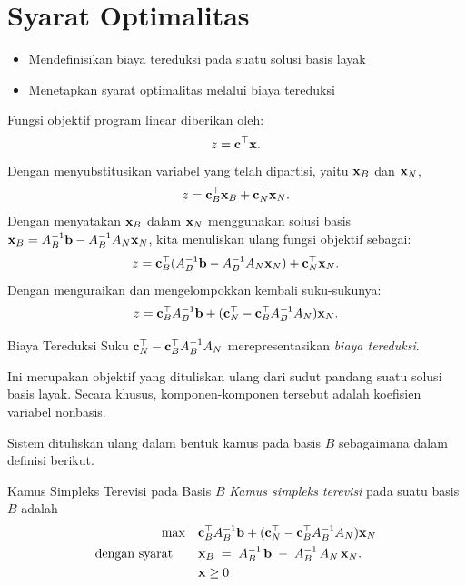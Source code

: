 \section{Syarat Optimalitas}
\label{sec:optimality-conditions}
\begin{outcome}
\begin{itemize}
\item Mendefinisikan biaya tereduksi pada suatu solusi basis layak
\item Menetapkan syarat optimalitas melalui biaya tereduksi
\end{itemize}
\end{outcome}
Fungsi objektif program linear diberikan oleh:
    \[
    z = \mathbf{c}^\top \mathbf{x}.
    \]
    Dengan menyubstitusikan variabel yang telah dipartisi, yaitu \( \mathbf{x}_B \) dan \( \mathbf{x}_N \),
    \[
    z =\mathbf{c}_B^\top \mathbf{x}_B +\mathbf{c}_N^\top \mathbf{x}_N.
    \]
    Dengan menyatakan \( \mathbf{x}_B \) dalam \( \mathbf{x}_N \) menggunakan solusi basis \( \mathbf{x}_B = A_B^{-1}\mathbf{b}- A_B^{-1} A_N \mathbf{x}_N \), kita menuliskan ulang fungsi objektif sebagai:
    \begin{equation}
    z =\mathbf{c}_B^\top (A_B^{-1}\mathbf{b}- A_B^{-1} A_N \mathbf{x}_N) +\mathbf{c}_N^\top \mathbf{x}_N.
    \end{equation}
    Dengan menguraikan dan mengelompokkan kembali suku-sukunya:
    \begin{equation}
    z =\mathbf{c}_B^\top A_B^{-1}\mathbf{b}+  (\mathbf{c}_N^\top -\mathbf{c}_B^\top A_B^{-1} A_N )\mathbf{x}_N.
    \end{equation}
    \begin{definition}{Biaya Tereduksi}{}
    Suku \(\mathbf{c}_N^\top -\mathbf{c}_B^\top A_B^{-1} A_N \) merepresentasikan \emph{biaya tereduksi}.  
    
    Ini merupakan objektif yang dituliskan ulang dari sudut pandang suatu solusi basis layak. Secara khusus, komponen-komponen tersebut adalah koefisien variabel nonbasis.
\end{definition}
    

Sistem dituliskan ulang dalam bentuk kamus pada basis $B$ sebagaimana dalam definisi berikut.

\begin{definition}{Kamus Simpleks Terevisi pada Basis $B$}{}
\emph{Kamus simpleks terevisi} pada suatu basis $B$ adalah 
\begin{equation}
\label{eq:dictionary-general}
\begin{aligned}
\max \quad & \mathbf{c}_B^\top A_B^{-1}\mathbf{b} + (\mathbf{c}_N^\top -  \mathbf{c}_B^\top A_B^{-1}A_N)\mathbf{x}_N\\
\mbox{dengan syarat}\quad \quad & 
 \mathbf{x}_B 
\;=\;
A_B^{-1}\,\mathbf{b}
\;-\;
A_B^{-1} \,A_N\,\mathbf{x}_N.\\
& \mathbf{x} \geq 0
\end{aligned}
\end{equation}
\end{definition}

